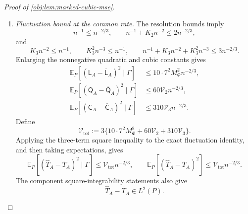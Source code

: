 \begin{proof}[Proof of \cref{obj:lem:marked-cubic-mse}]
\begin{enumerate}
There are exactly \(7^s(2^s-1)\) summands: \(7^s\) coordinate tuples, each with \(2^s-1\) nonempty subsets of evaluation positions. Define
\[
\mathcal V_s
:=
7^{2s}(2^s-1)^2M_\Phi^2
(1+U_{\mathrm{env}})^{2s}(1+V_{\mathrm{bin}})^s,
\qquad s=2,3.
\]
Applying the finite-sum square inequality to the displayed expansions gives
\[
\begin{aligned}
\mathbb E_P[(\mathsf Q_A-\overline{\mathsf Q}_A)^2\mid\Gamma]
&\le\mathcal V_2(n^{-1}+K_2n^{-2}),\\
\mathbb E_P[(\mathsf C_A-\overline{\mathsf C}_A)^2\mid\Gamma]
&\le\mathcal V_3(n^{-1}+K_3n^{-2}+K_3^2n^{-3}).
\end{aligned}
\]

\item \textit{Fluctuation bound at the common rate.}
The resolution bounds imply
\[
n^{-1}\le n^{-2/3},\qquad
n^{-1}+K_2n^{-2}\le2n^{-2/3},
\]
and
\[
K_3n^{-2}\le n^{-1},\qquad
K_3^2n^{-3}\le n^{-1},\qquad
n^{-1}+K_3n^{-2}+K_3^2n^{-3}\le3n^{-2/3}.
\]
Enlarging the nonnegative quadratic and cubic constants gives
\[
\begin{aligned}
\mathbb E_P[(\mathsf L_A-\overline{\mathsf L}_A)^2\mid\Gamma]
&\le10\cdot7^2M_\Phi^2n^{-2/3},\\
\mathbb E_P[(\mathsf Q_A-\overline{\mathsf Q}_A)^2\mid\Gamma]
&\le60\mathcal V_2n^{-2/3},\\
\mathbb E_P[(\mathsf C_A-\overline{\mathsf C}_A)^2\mid\Gamma]
&\le310\mathcal V_3n^{-2/3}.
\end{aligned}
\]
Define
\[
\mathcal V_{\mathrm{tot}}
:=3\{10\cdot7^2M_\Phi^2+60\mathcal V_2+310\mathcal V_3\}.
\]
Applying the three-term square inequality to the exact fluctuation identity, and then taking expectations, gives
\[
\mathbb E_P[(\widehat T_A-\overline T_A)^2\mid\Gamma]
\le\mathcal V_{\mathrm{tot}}n^{-2/3},
\qquad
\mathbb E_P[(\widehat T_A-\overline T_A)^2]
\le\mathcal V_{\mathrm{tot}}n^{-2/3}.
\]
The component square-integrability statements also give
\[
\widehat T_A-\overline T_A\in L^2(P).
\]


\end{enumerate}
\end{proof}
